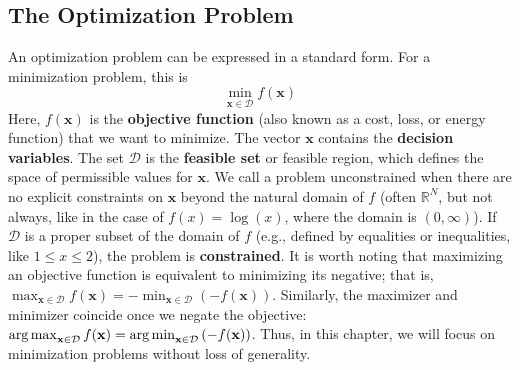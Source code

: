 \subsection{The Optimization Problem}
An optimization problem can be expressed in a standard form. For a minimization problem, this is
\begin{equation}
    \min_{\mathbf{x} \in \mathcal{D}} f(\mathbf{x})
\end{equation}
Here, $f(\mathbf{x})$ is the \textbf{objective function} (also known as a cost, loss, or energy function) that we want to minimize. The vector $\mathbf{x}$ contains the \textbf{decision variables}. The set $\mathcal{D}$ is the \textbf{feasible set} or feasible region, which defines the space of permissible values for $\mathbf{x}$. We call a problem unconstrained when there are no explicit constraints on $\mathbf{x}$ beyond the natural domain of $f$ (often $\mathbb{R}^N$, but not always, like in the case of $f(x) = \log(x)$, where the domain is $(0,\infty)$). If $\mathcal{D}$ is a proper subset of the domain of $f$ (e.g., defined by equalities or inequalities, like $1 \le x \le 2$), the problem is \textbf{constrained}. It is worth noting that maximizing an objective function is equivalent to minimizing its negative; that is, $\max_{\mathbf{x}\in\mathcal{D}} f(\mathbf{x}) = -\min_{\mathbf{x}\in\mathcal{D}}\left( -f(\mathbf{x}) \right)$. Similarly, the maximizer and minimizer coincide once we negate the objective: $\operatorname*{arg\,max}_{\mathbf{x}\in\mathcal{D}} f(\mathbf{x}) = \operatorname*{arg\,min}_{\mathbf{x}\in\mathcal{D}}\left( -f(\mathbf{x}) \right)$. Thus, in this chapter, we will focus on minimization problems without loss of generality.

